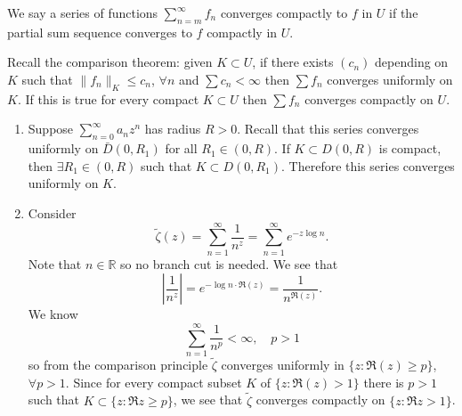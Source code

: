 \begin{defn}
We say a series of functions $\sum_{n=m}^\infty f_n$ converges
compactly to $f$ in $U$ if the partial sum sequence converges to $f$
compactly in $U$.
\end{defn}

Recall the comparison theorem: given $K \subset U$, if there exists
$(c_n)$ depending on $K$ such that $\|f_n\|_K \leq c_n$, $\forall n$
and $\sum c_n < \infty$ then $\sum f_n$ converges uniformly on $K$.
If this is true for every compact $K \subset U$ then $\sum f_n$
converges compactly on $U$.

\begin{xmpl}
  \begin{enumerate}
    \item{
      Suppose $\sum_{n=0}^\infty a_n z^n$ has radius $R > 0$. Recall that
      this series converges uniformly on $\bar{D}(0, R_1)$ for all
      $R_1 \in (0, R)$. If $K \subset D(0, R)$ is compact, then
      $\exists R_1 \in (0, R)$ such that $K \subset D(0, R_1)$. Therefore
      this series converges uniformly on $K$.
    }
    \item{
      Consider
      $$
        \tilde{\zeta}(z)
      = \sum_{n=1}^\infty \frac{1}{n^z}
      = \sum_{n=1}^\infty e^{-z \log n}.
      $$
      Note that $n \in \mathbb{R}$ so no branch cut is needed.
      We see that
      $$
        \left|
          \frac{1}{n^z}
        \right|
      = e^{-\log n \cdot \Re(z)}
      = \frac{1}{n^{\Re(z)}}.
      $$
      We know
      $$
      \sum_{n=1}^\infty
        \frac{1}{n^p}
      < \infty, \quad
      p > 1
      $$
      so from the comparison  principle $\tilde{\zeta}$ converges uniformly
      in $\{z : \Re(z) \geq p\}$, $\forall p > 1$. Since for
      every compact subset $K$ of $\{ z : \Re(z) > 1 \}$ there is $p >
      1$ such that $K \subset \{ z : \Re z \geq p \}$, we see that
      $\tilde{\zeta}$ converges compactly on $\{ z : \Re z > 1 \}$.

}
\end{enumerate}
\end{xmpl}
